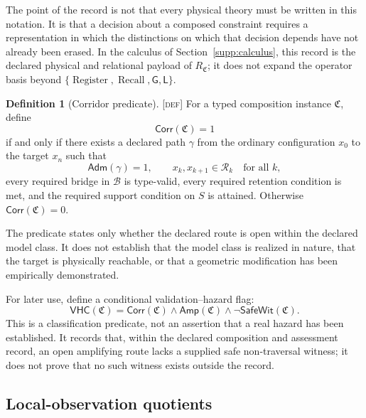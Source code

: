 \documentclass[11pt]{article}
\newcommand{\Register}{\ensuremath{\operatorname{Register}}}
\newcommand{\Recall}{\ensuremath{\operatorname{Recall}}}
\newcommand{\GOp}{\ensuremath{\mathsf{G}}}
\newcommand{\LOp}{\ensuremath{\mathsf{L}}}
\newcommand{\Defn}{\textsc{[def]}}
\theoremstyle{definition}
\newtheorem{sdefinition}{Definition}
\begin{document}
The point of the record is not that every physical theory must be written in
this notation. It is that a decision about a composed constraint requires a
representation in which the distinctions on which that decision depends have
not already been erased. In the calculus of Section~\ref{supp:calculus}, this
record is the declared physical and relational payload of $R_{\mathfrak C}$; it
does not expand the operator basis beyond $\{\Register,\Recall,\GOp,\LOp\}$.

\begin{sdefinition}[Corridor predicate]
\label{def:corridor-predicate}
\Defn{} For a typed composition instance $\mathfrak C$, define
\begin{equation}
\mathsf{Corr}(\mathfrak C)=1
\label{eq:corridor-predicate}
\end{equation}
if and only if there exists a declared path $\gamma$ from the ordinary
configuration $x_0$ to the target $x_n$ such that
\begin{equation}
\mathsf{Adm}(\gamma)=1,
\qquad
x_k,x_{k+1}\in\mathcal R_k
\quad
\text{for all }k,
\label{eq:corridor-admissibility}
\end{equation}
every required bridge in $\mathcal B$ is type-valid, every required retention
condition is met, and the required support condition on $S$ is attained.
Otherwise $\mathsf{Corr}(\mathfrak C)=0$.

The predicate states only whether the declared route is open within the
declared model class. It does not establish that the model class is realized in
nature, that the target is physically reachable, or that a geometric
modification has been empirically demonstrated.
\end{sdefinition}

For later use, define a conditional validation--hazard flag:
\begin{equation}
\mathsf{VHC}(\mathfrak C)
=
\mathsf{Corr}(\mathfrak C)
\wedge
\mathsf{Amp}(\mathfrak C)
\wedge
\neg\mathsf{SafeWit}(\mathfrak C).
\label{eq:validation-hazard-flag}
\end{equation}
This is a classification predicate, not an assertion that a real hazard has
been established. It records that, within the declared composition and assessment record, an open
amplifying route lacks a supplied safe non-traversal witness; it does not prove that
no such witness exists outside the record.

\subsection{Local-observation quotients}
\label{supp:local-quotient}
\end{document}
